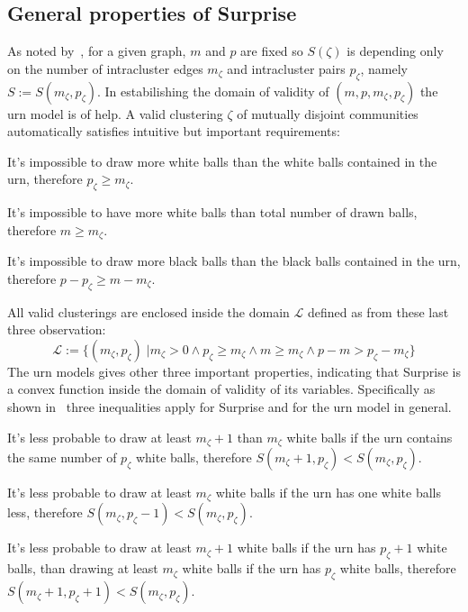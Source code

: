 \subsection{General properties of Surprise}
As noted by~\cite{fleck2014}, for a given graph, $m$ and $p$ are fixed so $S(\zeta)$ is depending only on the number of intracluster edges $m_\zeta$ and intracluster pairs $p_\zeta$, namely $S:=S(m_\zeta,p_\zeta)$.
In estabilishing the domain of validity of $(m,p,m_\zeta,p_\zeta)$ the urn model is of help. A valid clustering $\zeta$ of mutually disjoint communities automatically satisfies intuitive but important requirements:
\begin{obs}
It's impossible to draw more white balls than the white balls contained in the urn, therefore $p_\zeta \geq m_\zeta$.
\end{obs}
\begin{obs}
It's impossible to have more white balls than total number of drawn balls, therefore $m\geq m_\zeta$.
\end{obs}
\begin{obs}
It's impossible to draw more black balls than the black balls contained in the urn, therefore $p-p_\zeta \geq m-m_\zeta$.
\end{obs}
All valid clusterings are enclosed inside the domain $\mathcal{L}$ defined as from these last three observation:
\begin{equation}
\mathcal{L} := \{ ( m_\zeta,p_\zeta) \; | m_\zeta > 0 \land p_\zeta \geq m_\zeta \land m \geq m_\zeta \land p-m > p_\zeta - m_\zeta \}
\end{equation}
The urn models gives other three important properties, indicating that Surprise is a convex function inside the domain of validity of its variables. Specifically as shown in~\cite{fleck2014} three inequalities apply for Surprise and for the urn model in general.
\begin{props}\label{prop:prop1}
\label{list:surprise_properties} It's less probable to draw at least $m_\zeta+1$ than $m_\zeta$ white balls if the urn contains the same number of $p_\zeta$ white balls, therefore $S(m_\zeta+1,p_\zeta) < S(m_\zeta,p_\zeta)$.
\end{props}
\begin{props}\label{prop:prop2}
It's less probable to draw at least $m_\zeta$ white balls if the urn has one white balls less, therefore $S(m_\zeta,p_\zeta-1) < S(m_\zeta,p_\zeta)$.
\end{props}
\begin{props}\label{prop:prop3}
It's less probable to draw at least $m_\zeta+1$ white balls if the urn has $p_\zeta+1$ white balls, than drawing at least $m_\zeta$ white balls if the urn has $p_\zeta$ white balls, therefore $S(m_\zeta+1,p_\zeta+1) < S(m_\zeta,p_\zeta)$.
\end{props}
